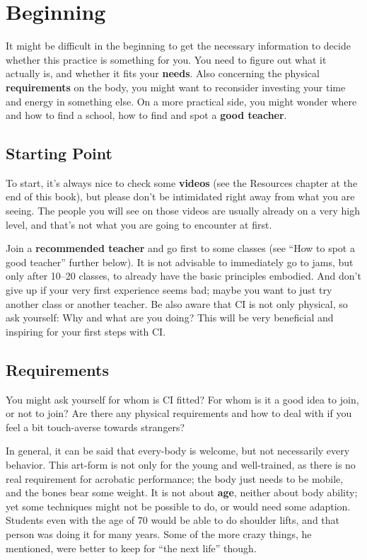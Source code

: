 \chapter{Beginning}\label{ch:beginning}


It might be difficult in the beginning to get the necessary information to decide whether this practice is something for you.
You need to figure out what it actually is, and whether it fits your \textbf{needs}.
Also concerning the physical \textbf{requirements} on the body, you might want to reconsider investing your time and energy in something else.
On a more practical side, you might wonder where and how to find a school, how to find and spot a \textbf{good teacher}.

\section{Starting Point}\label{sec:starting-point}

To start, it's always nice to check some \textbf{videos} (see the Resources chapter at the end of this book), but please don't be intimidated right away from what you are seeing.
The people you will see on those videos are usually already on a very high level, and that's not what you are going to encounter at first.

Join a \textbf{recommended teacher} and go first to some classes (see ``How to spot a good teacher'' further below).
It is not advisable to immediately go to jams, but only after 10--20 classes, to already have the basic principles embodied.
And don't give up if your very first experience seems bad; maybe you want to just try another class or another teacher.
Be also aware that CI is not only physical, so ask yourself: Why and what are you doing?
This will be very beneficial and inspiring for your first steps with CI\@.

\section{Requirements}\label{sec:requirements}

You might ask yourself for whom is CI fitted?
For whom is it a good idea to join, or not to join?
Are there any physical requirements and how to deal with if you feel a bit touch-averse towards strangers?

In general, it can be said that every-body is welcome, but not necessarily every behavior.
This art-form is not only for the young and well-trained, as there is no real requirement for acrobatic performance; the body just needs to be mobile, and the bones bear some weight.
It is not about \textbf{age}, neither about body ability; yet some techniques might not be possible to do, or would need some adaption.
Students even with the age of 70 would be able to do shoulder lifts, and that person was doing it for many years.
Some of the more crazy things, he mentioned, were better to keep for ``the next life'' though.


